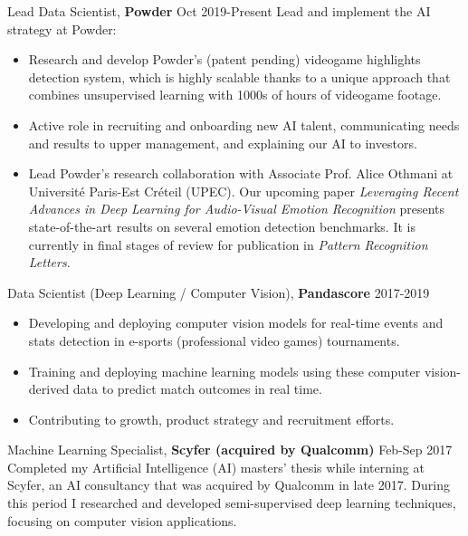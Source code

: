 \documentclass[margin]{res}
\begin{document}
\begin{resume}
		{Lead Data Scientist,} {\bf Powder} \hfill Oct 2019-Present\vspace{2mm}\newline
		Lead and implement the AI strategy at Powder:
		\vspace{1mm}
		\begin{itemize}
			\item Research and develop Powder's (patent pending) videogame highlights detection system, which is highly scalable thanks to a unique approach that combines unsupervised learning with 1000s of hours of videogame footage.
			\item Active role in recruiting and onboarding new AI talent, communicating needs and results to upper management, and explaining our AI to investors.
			\item Lead Powder's research collaboration with Associate Prof.  Alice Othmani at Universit\'e Paris-Est Cr\'eteil (UPEC). Our upcoming paper \textit{Leveraging Recent Advances in Deep Learning for Audio-Visual Emotion Recognition} presents state-of-the-art results on several emotion detection benchmarks. It is currently in final stages of review for publication in \textit{Pattern Recognition Letters}.
		\end{itemize}
		
		{Data Scientist (Deep Learning / Computer Vision),} {\bf Pandascore} \hfill 2017-2019
		\vspace{1mm}
		\begin{itemize}
			\item Developing and deploying computer vision models for real-time events and stats detection in e-sports (professional video games) tournaments.
			\item Training and deploying machine learning models using these computer vision-derived data to predict match outcomes in real time.
			\item Contributing to growth, product strategy and recruitment efforts.
		\end{itemize}
		
		{Machine Learning Specialist,} {\bf Scyfer (acquired by Qualcomm)} \hfill Feb-Sep 2017\vspace{1mm}\newline
		Completed my Artificial Intelligence (AI) masters' thesis while interning at Scyfer, an AI consultancy that was acquired by Qualcomm in late 2017. During this period I researched and developed semi-supervised deep learning techniques, focusing on computer vision applications.
		

\end{resume}
\end{document}

